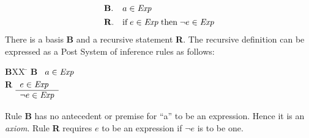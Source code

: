 \documentclass[12pt]{article}
\newcommand{\id}[1]{\mbox{\it #1\/}}
\newcommand{\rid}[1]{\mbox{\rm #1}}
\begin{document}





\[\begin{array}{ll}
{\bf B}. & a\in\id{Exp} \\[1ex]
{\bf R}. & \rid{if}\;e\in\id{Exp}\;\rid{then}\; \neg e\in\id{Exp}
\end{array}
\]
There is a basis {\bf B} and a recursive statement {\bf R}.
The recursive definition can be expressed as a Post System of inference rules as follows:
\begin{tabbing}
{\bf B}XX \=  \kill
{\bf B} \>
	\(\begin{array}[t]{l}
	a\in\id{Exp} 
	\end{array}\) \\[2ex]
{\bf R} \>
	\(\begin{array}[t]{l}
	e\in\id{Exp} \\
	\hline
	\neg e\in\id{Exp}
	\end{array}\) %
\end{tabbing}
Rule {\bf B} has no antecedent or premise for
``a'' to be an expression.
Hence it is an {\em axiom\/}.
Rule {\bf R} requires $e$ to be an expression if $\neg e$ is to be one.
\end{document}

